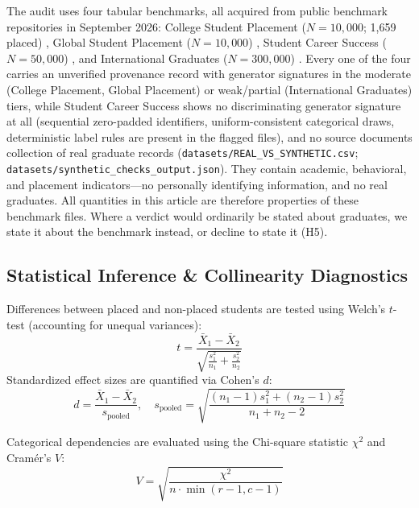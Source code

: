 \documentclass[journal]{IEEEtran}
\begin{document}
The audit uses four tabular benchmarks, all acquired from public benchmark repositories in September 2026: College Student Placement ($N = 10{,}000$; 1,659 placed) \cite{sumedh15072024college}, Global Student Placement ($N = 10{,}000$) \cite{rakesh6302024global}, Student Career Success ($N = 50{,}000$) \cite{mobeenfatimah2024career}, and International Graduates ($N = 300{,}000$) \cite{quackquackrp2024international}. Every one of the four carries an unverified provenance record with generator signatures in the moderate (College Placement, Global Placement) or weak/partial (International Graduates) tiers, while Student Career Success shows no discriminating generator signature at all (sequential zero-padded identifiers, uniform-consistent categorical draws, deterministic label rules are present in the flagged files), and no source documents collection of real graduate records (\texttt{datasets/REAL\_VS\_SYNTHETIC.csv}; \texttt{datasets/synthetic\_checks\_output.json}). They contain academic, behavioral, and placement indicators---no personally identifying information, and no real graduates. All quantities in this article are therefore properties of these benchmark files. Where a verdict would ordinarily be stated about graduates, we state it about the benchmark instead, or decline to state it (H5).

\subsection{Statistical Inference \& Collinearity Diagnostics}

Differences between placed and non-placed students are tested using Welch's $t$-test (accounting for unequal variances):
\begin{equation}
t = \frac{\bar{X}_1 - \bar{X}_2}{\sqrt{\frac{s_1^2}{n_1} + \frac{s_2^2}{n_2}}}
\label{eq:welch}
\end{equation}
Standardized effect sizes are quantified via Cohen's $d$:
\begin{equation}
d = \frac{\bar{X}_1 - \bar{X}_2}{s_{\text{pooled}}}, \quad s_{\text{pooled}} = \sqrt{\frac{(n_1-1)s_1^2 + (n_2-1)s_2^2}{n_1 + n_2 - 2}}
\label{eq:cohen}
\end{equation}

Categorical dependencies are evaluated using the Chi-square statistic $\chi^2$ and Cram\'er's $V$:
\begin{equation}
V = \sqrt{\frac{\chi^2}{n \cdot \min(r-1, c-1)}}
\label{eq:cramer}
\end{equation}
\end{document}
